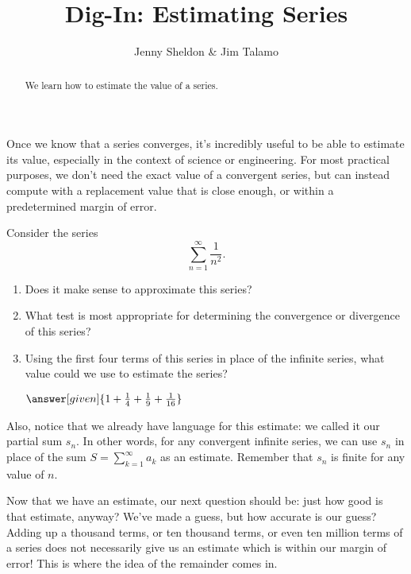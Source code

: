 \documentclass{ximera}
\author{Jenny Sheldon \& Jim Talamo}
\title{Dig-In: Estimating Series}
\begin{document}
\begin{abstract}
    We learn how to estimate the value of a series.
\end{abstract}
\maketitle

Once we know that a series converges, it's incredibly useful to be able to estimate its value, especially in the context of science or engineering.  For most practical purposes, we don't need the exact value of a convergent series, but can instead compute with a replacement value that is close enough, or within a predetermined margin of error.

\begin{question}
Consider the series
\[
\sum_{n=1}^{\infty} \frac{1}{n^2}.
\]
\begin{enumerate}
    \item Does it make sense to approximate this series?
        \begin{prompt}
        \end{prompt}
    \item What test is most appropriate for determining the convergence or divergence of this series?
        \begin{prompt}
        \end{prompt}
    \item Using the first four terms of this series in place of the infinite series, what value could we use to estimate the series?
        \begin{prompt}
        $\answer[given]{1 + \frac{1}{4}+ \frac{1}{9} + \frac{1}{16}}$
        \end{prompt}
\end{enumerate}

\end{question}


Also, notice that we already have language for this estimate: we called it our partial sum $s_n$.  In other words, for any convergent infinite series, we can use $s_n$ in place of the sum $S = \sum \limits_{k=1}^\infty a_k$ as an estimate.  Remember that $s_n$ is finite for any value of $n$.

Now that we have an estimate, our next question should be: just how good is that estimate, anyway?  We've made a guess, but how accurate is our guess?  Adding up a thousand terms, or ten thousand terms, or even ten million terms of a series does not necessarily give us an estimate which is within our margin of error!  This is where the idea of the remainder comes in.
\end{document}
